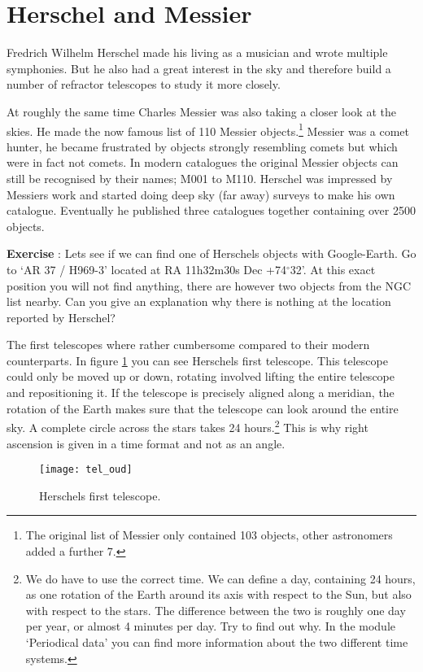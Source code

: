 \section{Herschel and Messier}
Fredrich Wilhelm Herschel made his living as a musician and wrote multiple symphonies. But he also had a great interest in the sky and therefore build a number of refractor telescopes to study it more closely.

At roughly the same time Charles Messier was also taking a closer look at the skies. He made the now famous list of 110 Messier objects.\footnote{The original list of Messier only contained 103 objects, other astronomers added a further 7.} Messier was a comet hunter, he became frustrated by objects strongly resembling comets but which were in fact not comets. In modern catalogues the original Messier objects can still be recognised by their names; M001 to M110. Herschel was impressed by Messiers work and started doing deep sky (far away) surveys to make his own catalogue. Eventually he published three catalogues together containing over 2500 objects.

\begin{shaded}
\textbf{Exercise \theExercise {}} : Lets see if we can find one of Herschels objects with Google-Earth. Go to `AR 37 / H969-3' located at RA 11h32m30s Dec +74$^{\circ}$32'. At this exact position you will not find anything, there are however two objects from the NGC list nearby. Can you give an explanation why there is nothing at the location reported by Herschel?\end{shaded}

The first telescopes where rather cumbersome compared to their modern counterparts. In figure \ref{fig:tel_oud} you can see Herschels first telescope. This telescope could only be moved up or down, rotating  involved lifting the entire telescope and repositioning it. If the telescope is precisely aligned along a meridian, the rotation of the Earth makes sure that the telescope can look around the entire sky. A complete circle across the stars takes 24 hours.\footnote{We do have to use the correct time. We can define a day, containing 24 hours, as one rotation of the Earth around its axis with respect to the Sun, but also with respect to the stars. The difference between the two is roughly one day per year, or almost 4 minutes per day. Try to find out why. In the module `Periodical data' you can find more information about the two different time systems.} This is why right ascension is given in a time format and not as an angle. 
\begin{figure}\begin{center}
\texttt{[image: tel\_oud]}
\caption{Herschels first telescope.}\label{fig:tel_oud}
\end{center}\end{figure} 

